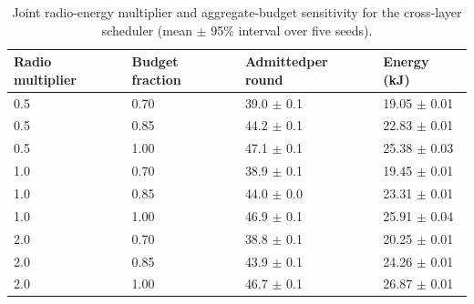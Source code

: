 \begin{table}[!ht]
\caption{Joint radio-energy multiplier and aggregate-budget sensitivity for the cross-layer scheduler (mean $\pm$ 95\% interval over five seeds).}
\label{tab:radio-budget}
\centering
\setlength{\tabcolsep}{2pt}
\begin{tabular}{|p{}|p{}|p{}|p{}|}
\hline
Radio multiplier & Budget fraction & Admitted\newline{}per round & Energy (kJ) \\
\hline
0.5 & 0.70 & 39.0 $\pm$ 0.1 & 19.05 $\pm$ 0.01 \\
\hline
0.5 & 0.85 & 44.2 $\pm$ 0.1 & 22.83 $\pm$ 0.01 \\
\hline
0.5 & 1.00 & 47.1 $\pm$ 0.1 & 25.38 $\pm$ 0.03 \\
\hline
1.0 & 0.70 & 38.9 $\pm$ 0.1 & 19.45 $\pm$ 0.01 \\
\hline
1.0 & 0.85 & 44.0 $\pm$ 0.0 & 23.31 $\pm$ 0.01 \\
\hline
1.0 & 1.00 & 46.9 $\pm$ 0.1 & 25.91 $\pm$ 0.04 \\
\hline
2.0 & 0.70 & 38.8 $\pm$ 0.1 & 20.25 $\pm$ 0.01 \\
\hline
2.0 & 0.85 & 43.9 $\pm$ 0.1 & 24.26 $\pm$ 0.01 \\
\hline
2.0 & 1.00 & 46.7 $\pm$ 0.1 & 26.87 $\pm$ 0.01 \\
\hline
\end{tabular}
\end{table}
